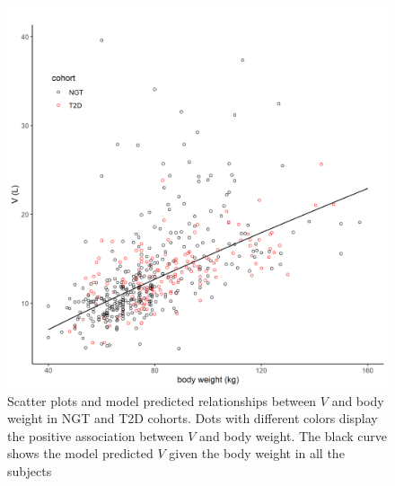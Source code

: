 \documentclass[utf8]{frontiersSCNS} %
\begin{document}
\begin{figure}[h!]
\begin{center}
\includegraphics[width=15cm]{V_BW.PNG}
\end{center}
\caption{Scatter plots and model predicted relationships between $V$ and body weight in NGT and T2D cohorts. Dots with different colors display the positive association between $V$ and body weight. The black curve shows the model predicted $V$ given the body weight in all the subjects}
\label{fig: V_BW}
\end{figure}
\end{document}
